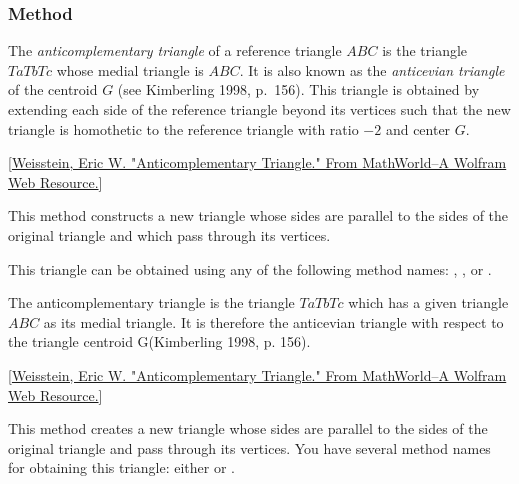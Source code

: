 
\subsubsection{Method } %
\label{ssub:method_triangle_anti}

The \emph{anticomplementary triangle} of a reference triangle $ABC$ is the triangle $TaTbTc$ whose medial triangle is $ABC$. It is also known as the \emph{anticevian triangle} of the centroid $G$ (see Kimberling 1998, p.~156). This triangle is obtained by extending each side of the reference triangle beyond its vertices such that the new triangle is homothetic to the reference triangle with ratio $-2$ and center $G$.
\begin{flushright}
  \small
[\href{https://mathworld.wolfram.com/AnticomplementaryTriangle.html}{Weisstein, Eric W. "Anticomplementary Triangle." From MathWorld--A Wolfram Web Resource.}]
\end{flushright}

\medskip
\noindent
This method constructs a new triangle whose sides are parallel to the sides of the original triangle and which pass through its vertices.

\medskip
\noindent
This triangle can be obtained using any of the following method names: , , or .

\vspace{1em}



The anticomplementary triangle is the triangle $TaTbTc$ which has a given triangle $ABC$ as its medial triangle. It is therefore the anticevian triangle with respect to the triangle centroid G(Kimberling 1998, p. 156).
\begin{flushright}
  \small
 [\href{https://mathworld.wolfram.com/AnticomplementaryTriangle.html}{Weisstein, Eric W. "Anticomplementary Triangle." From MathWorld--A Wolfram Web Resource.}]
\end{flushright}

This method creates a new triangle whose sides are parallel to the sides of the original triangle and pass through its vertices.
You have several method names for obtaining this triangle: either   or .

\vspace{1em}

